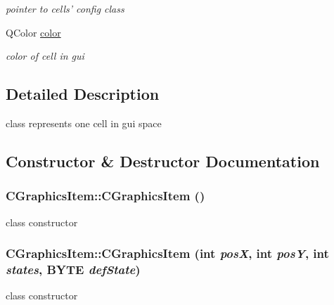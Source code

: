 \begin{DoxyCompactItemize}
\begin{DoxyCompactList}\small\item\em pointer to cells' config class \item\end{DoxyCompactList}\item 
\hypertarget{classCGraphicsItem_a64eee04ebeb713d942e59b209c8ad6c7}{
QColor \hyperlink{classCGraphicsItem_a64eee04ebeb713d942e59b209c8ad6c7}{color}}
\label{classCGraphicsItem_a64eee04ebeb713d942e59b209c8ad6c7}

\begin{DoxyCompactList}\small\item\em color of cell in gui \item\end{DoxyCompactList}\end{DoxyCompactItemize}


\subsection{Detailed Description}
class represents one cell in gui space 

\subsection{Constructor \& Destructor Documentation}
\hypertarget{classCGraphicsItem_ae1cfa0f541eadcf6a72d23c0386d80ac}{
\subsubsection[{CGraphicsItem}]{\setlength{\rightskip}{0pt plus 5cm}CGraphicsItem::CGraphicsItem ()}}
\label{classCGraphicsItem_ae1cfa0f541eadcf6a72d23c0386d80ac}
class constructor \hypertarget{classCGraphicsItem_ac6af1bfd1ec6e5d42ee0590dffcd920f}{
\subsubsection[{CGraphicsItem}]{\setlength{\rightskip}{0pt plus 5cm}CGraphicsItem::CGraphicsItem (int {\em posX}, \/  int {\em posY}, \/  int {\em states}, \/  BYTE {\em defState})}}
\label{classCGraphicsItem_ac6af1bfd1ec6e5d42ee0590dffcd920f}
class constructor


